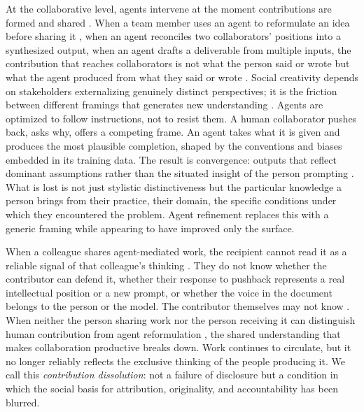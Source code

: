\documentclass[manuscript,review]{acmart}
\begin{document}
At the collaborative level, agents intervene at the moment contributions are formed and shared \cite{mysore2025prototypical}. When a team member uses an agent to reformulate an idea before sharing it \cite{ulloa2025product, he2024ai}, when an agent reconciles two collaborators' positions into a synthesized output, when an agent drafts a deliverable from multiple inputs, the contribution that reaches collaborators is not what the person said or wrote but what the agent produced from what they said or wrote \cite{draxler2024ai}. Social creativity depends on stakeholders externalizing genuinely distinct perspectives; it is the friction between different framings that generates new understanding \cite{fischer1999symmetry}. Agents are optimized to follow instructions, not to resist them. A human collaborator pushes back, asks why, offers a competing frame. An agent takes what it is given and produces the most plausible completion, shaped by the conventions and biases embedded in its training data. The result is convergence: outputs that reflect dominant assumptions rather than the situated insight of the person prompting \cite{haraway2013situated}. What is lost is not just stylistic distinctiveness but the particular knowledge a person brings from their practice, their domain, the specific conditions under which they encountered the problem. Agent refinement replaces this with a generic framing while appearing to have improved only the surface.


When a colleague shares agent-mediated work, the recipient cannot read it as a reliable signal of that colleague's thinking \cite{imteyaz2026co, he2025contributions}. They do not know whether the contributor can defend it, whether their response to pushback represents a real intellectual position or a new prompt, or whether the voice in the document belongs to the person or the model. The contributor themselves may not know \cite{zindulka2025ai}. When neither the person sharing work nor the person receiving it can distinguish human contribution from agent reformulation \cite{he2025contributions}, the shared understanding that makes collaboration productive breaks down. Work continues to circulate, but it no longer reliably reflects the exclusive thinking of the people producing it. We call this \textit{contribution dissolution}: not a failure of disclosure but a condition in which the social basis for attribution, originality, and accountability has been blurred.
\end{document}
